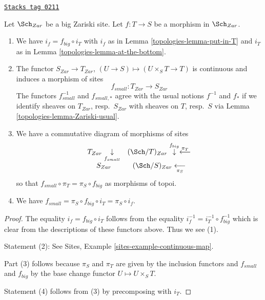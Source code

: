 \begin{lemma}
\label{topologies-lemma-morphism-big-small}
\href{https://stacks.math.columbia.edu/tag/0211}{\texttt{Stacks tag 0211}}

Let $\Sch_{Zar}$ be a big Zariski site.
Let $f : T \to S$ be a morphism in $\Sch_{Zar}$.
\begin{enumerate}
\item We have $i_f = f_{big} \circ i_T$ with $i_f$ as in
Lemma \ref{topologies-lemma-put-in-T} and $i_T$ as in
Lemma \ref{topologies-lemma-at-the-bottom}.
\item The functor $S_{Zar} \to T_{Zar}$,
$(U \to S) \mapsto (U \times_S T \to T)$ is continuous and induces
a morphism of sites
$$
f_{small} :
T_{Zar}
\longrightarrow
S_{Zar}
$$
The functors $f_{small}^{-1}$ and $f_{small, *}$ agree with
the usual notions $f^{-1}$ and $f_*$ if we identify sheaves
on $T_{Zar}$, resp.\ $S_{Zar}$ with sheaves on $T$, resp.\ $S$
via Lemma \ref{topologies-lemma-Zariski-usual}.
\item We have a commutative diagram of morphisms of sites
$$
\begin{array}{cc}T_{Zar} \underset{f_{small}}{\downarrow} & (\Sch/T)_{Zar} \overset{f_{big}}{\downarrow}\overset{\pi_T}{\longleftarrow} \\ S_{Zar} & (\Sch/S)_{Zar} \underset{\pi_S}{\longleftarrow}\end{array}
$$
so that $f_{small} \circ \pi_T = \pi_S \circ f_{big}$ as morphisms of topoi.
\item We have $f_{small} = \pi_S \circ f_{big} \circ i_T = \pi_S \circ i_f$.
\end{enumerate}
\end{lemma}

\begin{proof}
The equality $i_f = f_{big} \circ i_T$ follows from the
equality $i_f^{-1} = i_T^{-1} \circ f_{big}^{-1}$ which is
clear from the descriptions of these functors above.
Thus we see (1).

\medskip\noindent
Statement (2): See Sites, Example \ref{sites-example-continuous-map}.

\medskip\noindent
Part (3) follows because $\pi_S$ and $\pi_T$ are given by
the inclusion functors and $f_{small}$ and $f_{big}$ by the
base change functor $U \mapsto U \times_S T$.

\medskip\noindent
Statement (4) follows from (3) by precomposing with $i_T$.
\end{proof}

